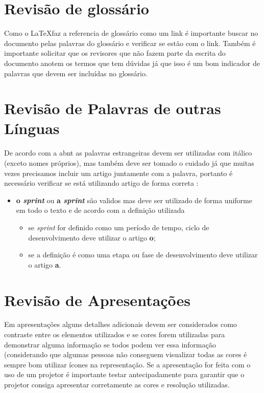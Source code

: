\section{Revisão de glossário}
\label{buscas-glossario}

Como o \LaTeX \space faz a referencia de glossário como um link é importante buscar no documento pelas palavras do glossário e verificar se estão com o link. Também é importante solicitar que os revisores que não fazem parte da escrita do documento anotem os termos que tem dúvidas já que isso é um bom indicador de palavras que devem ser incluídas no glossário.


\section{Revisão de Palavras de outras Línguas}
\label{revisao-palavras-estrangeiras}

De acordo com a \ac{abnt} as palavras estrangeiras devem ser utilizadas com itálico (exceto nomes próprios), mas também deve ser tomado o cuidado já que muitas vezes precisamos incluir um artigo juntamente com a palavra, portanto é necessário verificar  se está utilizando artigo de forma correta :

\begin{itemize}
    \item \textbf{o \textit{sprint}} ou \textbf{a \textit{sprint}} são validos mas deve ser utilizado de forma uniforme em todo o texto e de acordo com a definição utilizada 
    \begin{itemize}
        \item se \textit{sprint} for definido como um período de tempo, ciclo de desenvolvimento deve utilizar o artigo \textbf{o};
        
        \item se a definição é como uma etapa ou fase de desenvolvimento deve utilizar o artigo \textbf{a}.
    \end{itemize}
    
\end{itemize}


\section{Revisão de Apresentações}
\label{revisao-apresentacoes}

Em apresentações alguns detalhes adicionais devem ser considerados como contraste entre os elementos utilizados e se cores forem utilizadas para demonstrar alguma informação se todos podem ver essa informação (considerando que algumas pessoas não conseguem visualizar todas as cores é sempre bom utilizar ícones na representação. Se a apresentação for feita com o uso de um projetor é importante testar antecipadamente para garantir que o projetor consiga apresentar corretamente as cores e resolução utilizadas.




